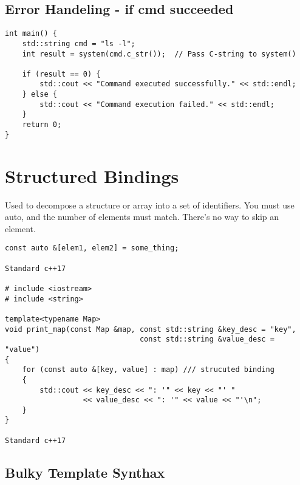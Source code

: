 \subsection{Error Handeling - if cmd succeeded}

\begin{verbatim}
int main() {
    std::string cmd = "ls -l";
    int result = system(cmd.c_str());  // Pass C-string to system()

    if (result == 0) {
        std::cout << "Command executed successfully." << std::endl;
    } else {
        std::cout << "Command execution failed." << std::endl;
    }
    return 0;
}
\end{verbatim}

\section{Structured Bindings}

Used to decompose a structure or array into a set of identifiers.
You must use auto, and the number of elements must match. There's no way to skip an element.

\begin{verbatim}
const auto &[elem1, elem2] = some_thing;

Standard c++17

# include <iostream>
# include <string>

template<typename Map>
void print_map(const Map &map, const std::string &key_desc = "key",
                               const std::string &value_desc = "value")
{
    for (const auto &[key, value] : map) /// strucuted binding
    {
        std::cout << key_desc << ": '" << key << "' "
                  << value_desc << ": '" << value << "'\n";
    }
}

Standard c++17
\end{verbatim}

\subsection{Bulky Template Synthax}


